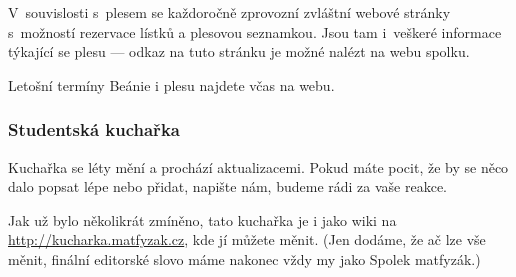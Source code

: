 V~souvislosti s~plesem se každoročně zprovozní zvláštní webové
stránky s~možností rezervace lístků a plesovou seznamkou. Jsou tam
i~veškeré informace týkající se plesu --- odkaz na tuto stránku je
možné nalézt na webu spolku.

Letošní termíny Beánie i plesu najdete včas na webu.

\subsubsection{Studentská kuchařka}

Kuchařka se léty mění a prochází aktualizacemi. Pokud máte pocit,
že by se něco dalo popsat lépe nebo přidat, napište nám, budeme
rádi za vaše reakce.

Jak už bylo několikrát zmíněno, tato kuchařka je i jako wiki na \url{http://kucharka.matfyzak.cz}, kde jí můžete měnit. (Jen dodáme, že ač lze vše měnit, finální editorské slovo máme nakonec vždy my jako Spolek matfyzák.)